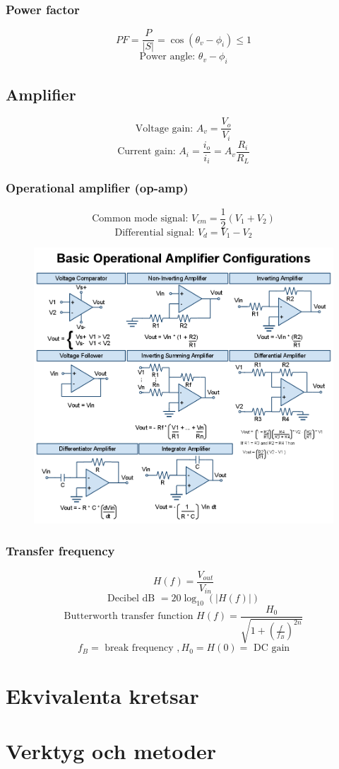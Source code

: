 \documentclass{article}
\begin{document}
\subsubsection{Power factor}
\[ PF = \frac{P}{|S|} = \cos(\theta_v - \phi_i) \leq 1 \]
\[ \textrm{Power angle: } \theta_v - \phi_i \]

\subsection{Amplifier}
\[ \textrm{Voltage gain: } A_v = \frac{V_o}{V_i} \]
\[ \textrm{Current gain: } A_i = \frac{i_o}{i_i} = A_v \frac{R_i}{R_L} \]

\subsubsection{Operational amplifier (op-amp)}
\[ \textrm{Common mode signal: } V_{cm} = \frac{1}{2}(V_1 + V_2) \]
\[ \textrm{Differential signal: } V_d = V_1 - V_2 \]

\begin{figure}[H]
    \centering
        \includegraphics[scale=0.35]{opamps.png}
    \label{fig:opamps}
\end{figure}

\subsubsection{Transfer frequency}
\[ H(f) = \frac{V_{out}}{V_{in}} \]
\[ \textrm{Decibel dB } = 20 \log_{10}(|H(f)|) \]
\[ \textrm{Butterworth transfer function } H(f) = \frac{H_0}{\sqrt{1 + \left( \frac{f}{f_B} \right)^{2n}}} \]
\[ f_B = \textrm{ break frequency }, H_0 = H(0) = \textrm{ DC gain} \]


\section{Ekvivalenta kretsar}


\section{Verktyg och metoder}

\end{document}
